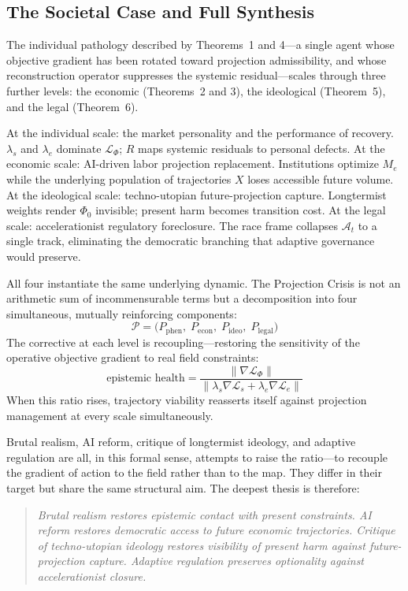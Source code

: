 \documentclass[12pt, a4paper]{article}
\theoremstyle{plain}
\theoremstyle{definition}
\theoremstyle{remark}
\begin{document}
\subsection{The Societal Case and Full Synthesis}

The individual pathology described by Theorems~1 and 4---a single agent whose
objective gradient has been rotated toward projection admissibility, and whose
reconstruction operator suppresses the systemic residual---scales through three
further levels: the economic (Theorems~2 and 3), the ideological (Theorem~5),
and the legal (Theorem~6).

At the individual scale: the market personality and the performance of recovery.
$\lambda_s$ and $\lambda_e$ dominate $\mathcal{L}_\Phi$; $R$ maps systemic
residuals to personal defects.
At the economic scale: AI-driven labor projection replacement.
Institutions optimize $M_e$ while the underlying population of trajectories $X$
loses accessible future volume.
At the ideological scale: techno-utopian future-projection capture.
Longtermist weights render $\Phi_0$ invisible; present harm becomes transition cost.
At the legal scale: accelerationist regulatory foreclosure.
The race frame collapses $\mathcal{A}_t$ to a single track, eliminating the
democratic branching that adaptive governance would preserve.

All four instantiate the same underlying dynamic.
The Projection Crisis is not an arithmetic sum of incommensurable terms but a
decomposition into four simultaneous, mutually reinforcing components:
\[
\boxed{
\mathcal{P} = \bigl(P_{\mathrm{phen}},\; P_{\mathrm{econ}},\; P_{\mathrm{ideo}},\; P_{\mathrm{legal}}\bigr)
}
\]
The corrective at each level is recoupling---restoring the sensitivity of the
operative objective gradient to real field constraints:
\[
\boxed{
\text{epistemic health}
= \frac{\|\nabla \mathcal{L}_\Phi\|}
{\|\lambda_s \nabla \mathcal{L}_s + \lambda_e \nabla \mathcal{L}_e\|}
}
\]
When this ratio rises, trajectory viability reasserts itself against projection
management at every scale simultaneously.

Brutal realism, AI reform, critique of longtermist ideology, and adaptive regulation
are all, in this formal sense, attempts to raise the ratio---to recouple the
gradient of action to the field rather than to the map.
They differ in their target but share the same structural aim.
The deepest thesis is therefore:

\begin{quote}
\itshape
Brutal realism restores epistemic contact with present constraints.
AI reform restores democratic access to future economic trajectories.
Critique of techno-utopian ideology restores visibility of present harm
against future-projection capture.
Adaptive regulation preserves optionality against accelerationist closure.
\end{quote}
\end{document}
